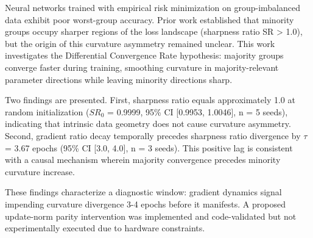 
Neural networks trained with empirical risk minimization on group-imbalanced data exhibit poor worst-group accuracy. Prior work established that minority groups occupy sharper regions of the loss landscape (sharpness ratio SR > 1.0), but the origin of this curvature asymmetry remained unclear. This work investigates the Differential Convergence Rate hypothesis: majority groups converge faster during training, smoothing curvature in majority-relevant parameter directions while leaving minority directions sharp.

Two findings are presented. First, sharpness ratio equals approximately 1.0 at random initialization ($SR_0$ = 0.9999, 95\% CI [0.9953, 1.0046], n = 5 seeds), indicating that intrinsic data geometry does not cause curvature asymmetry. Second, gradient ratio decay temporally precedes sharpness ratio divergence by $\tau$ = 3.67 epochs (95\% CI [3.0, 4.0], n = 3 seeds). This positive lag is consistent with a causal mechanism wherein majority convergence precedes minority curvature increase.

These findings characterize a diagnostic window: gradient dynamics signal impending curvature divergence 3-4 epochs before it manifests. A proposed update-norm parity intervention was implemented and code-validated but not experimentally executed due to hardware constraints.

